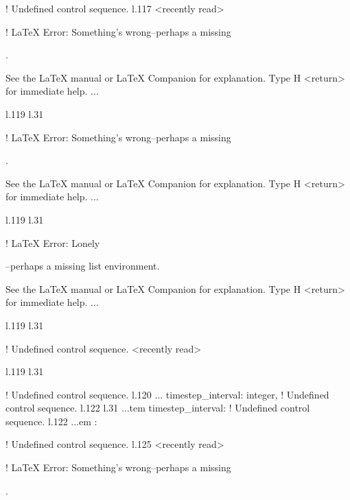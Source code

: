 {{{{{{{{{{{{! Undefined control sequence.
l.117 <recently read> \xmlNode
                              

! LaTeX Error: Something's wrong--perhaps a missing \item.

See the LaTeX manual or LaTeX Companion for explanation.
Type  H <return>  for immediate help.
 ...                                              
                                                  
l.119 l.31     \item \xmlNode
                             

! LaTeX Error: Something's wrong--perhaps a missing \item.

See the LaTeX manual or LaTeX Companion for explanation.
Type  H <return>  for immediate help.
 ...                                              
                                                  
l.119 l.31     \item \xmlNode
                             

! LaTeX Error: Lonely \item--perhaps a missing list environment.

See the LaTeX manual or LaTeX Companion for explanation.
Type  H <return>  for immediate help.
 ...                                              
                                                  
l.119 l.31     \item \xmlNode
                             
! Undefined control sequence.
<recently read> \xmlNode 
                         
l.119 l.31     \item \xmlNode
                             
! Undefined control sequence.
l.120 ...           {timestep\_interval}: \xmlDesc
                                                  {integer},
! Undefined control sequence.
l.122 l.31 ...tem \xmlNode
                          {timestep\_interval}: \xmlDesc
! Undefined control sequence.
l.122 ...em : \xmlDesc
                                                  
! Undefined control sequence.
l.125 <recently read> \xmlNode
                              

! LaTeX Error: Something's wrong--perhaps a missing \item.

}}}}}}}}}}}}
